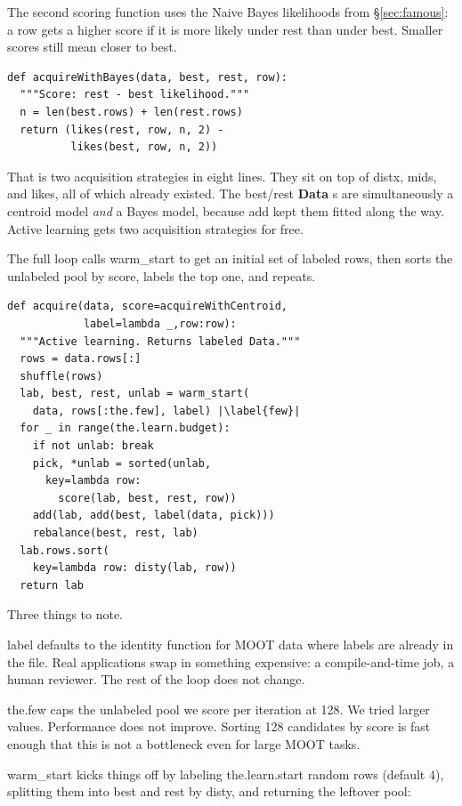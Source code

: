 \documentclass[AMA,STIX2COL]{WileyNJDv5}
\newcommand{\cls}[1]{%
  \setlength{\fboxsep}{1.5pt}%
  \colorbox{clsbg}{\sffamily\bfseries{#1}}%
}
\begin{document}
The second scoring function uses the Naive Bayes likelihoods
from \S\ref{sec:famous}: a row gets a higher score if it is
more likely under \textsf{rest} than under \textsf{best}.
Smaller scores still mean closer to \textsf{best}.

\begin{verbatim}
def acquireWithBayes(data, best, rest, row):
  """Score: rest - best likelihood."""
  n = len(best.rows) + len(rest.rows)
  return (likes(rest, row, n, 2) -
          likes(best, row, n, 2))
\end{verbatim}

That is two acquisition strategies in eight lines. They sit on
top of \textsf{distx}, \textsf{mids}, and \textsf{likes}, all of
which already existed. The \textsf{best}/\textsf{rest}
\cls{Data}s are simultaneously a centroid model {\em and} a
Bayes model, because \textsf{add} kept them fitted along the way.
Active learning gets two acquisition strategies for free.

The full loop calls \textsf{warm\_start} to get an initial set
of labeled rows, then sorts the unlabeled pool by
\textsf{score}, labels the top one, and repeats.

\begin{verbatim}
def acquire(data, score=acquireWithCentroid,
            label=lambda _,row:row):
  """Active learning. Returns labeled Data."""
  rows = data.rows[:]
  shuffle(rows)
  lab, best, rest, unlab = warm_start(
    data, rows[:the.few], label) |\label{few}|
  for _ in range(the.learn.budget):
    if not unlab: break
    pick, *unlab = sorted(unlab,
      key=lambda row:
        score(lab, best, rest, row))
    add(lab, add(best, label(data, pick)))
    rebalance(best, rest, lab)
  lab.rows.sort(
    key=lambda row: disty(lab, row))
  return lab
\end{verbatim}

Three things to note.

\textsf{label} defaults to the identity function for MOOT data
where labels are already in the file. Real applications swap in
something expensive: a compile-and-time job, a human reviewer.
The rest of the loop does not change.

\textsf{the.few} caps the unlabeled pool we score per iteration
at 128. We tried larger values. Performance does not improve.
Sorting 128 candidates by \textsf{score} is fast enough that
this is not a bottleneck even for large MOOT tasks.

\textsf{warm\_start} kicks things off by labeling \textsf{the.learn.start}
random rows (default 4), splitting them into \textsf{best} and
\textsf{rest} by \textsf{disty}, and returning the leftover pool:
\end{document}
